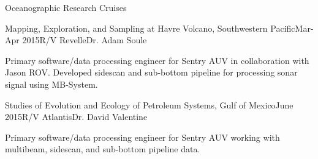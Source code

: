 \documentclass{resume} %
\begin{document}
\begin{rSection}{Oceanographic Research Cruises}
\begin{rSubsection}{Mapping, Exploration, and Sampling at Havre Volcano, Southwestern Pacific}{Mar-Apr 2015}{R/V Revelle}{Dr. Adam Soule}
\item{Primary software/data processing engineer for Sentry AUV in collaboration with Jason ROV. Developed sidescan and sub-bottom pipeline for processing sonar signal using MB-System.}
\end{rSubsection}


\begin{rSubsection}{Studies of Evolution and Ecology of Petroleum Systems, Gulf of Mexico}{June 2015}{R/V Atlantis}{Dr. David Valentine}
\item{Primary software/data processing engineer for Sentry AUV working with multibeam, sidescan, and sub-bottom pipeline data.}
\end{rSubsection}
\end{rSection}
%
%
%
%
%
%
\end{document}
